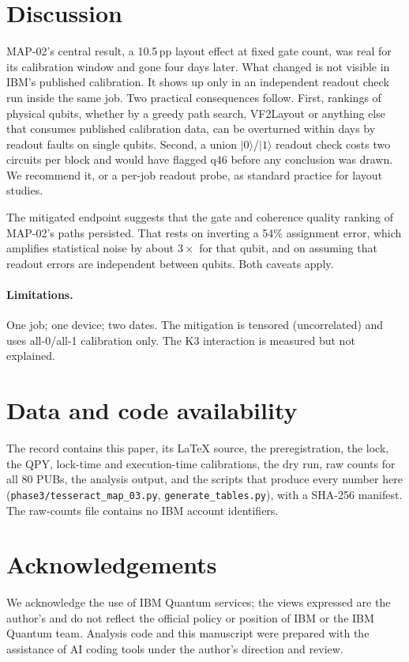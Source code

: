 \documentclass[10pt,twocolumn]{article}
\begin{document}
\section{Discussion}
MAP-02's central result, a 10.5\,pp layout effect at fixed gate count, was real for its calibration
window and gone four days later. What changed is not visible in IBM's published calibration. It
shows up only in an independent readout check run inside the same job. Two practical consequences
follow. First, rankings of physical qubits, whether by a greedy path search, VF2Layout or anything
else that consumes published calibration data, can be overturned within days by readout faults on
single qubits. Second, a union $|0\rangle$/$|1\rangle$ readout check costs two circuits per block and
would have flagged q46 before any conclusion was drawn. We recommend it, or a per-job readout probe,
as standard practice for layout studies.

The mitigated endpoint suggests that the gate and coherence quality ranking of MAP-02's paths
persisted. That rests on inverting a 54\% assignment error, which amplifies statistical noise by about
$3\times$ for that qubit, and on assuming that readout errors are independent between qubits. Both
caveats apply.

\paragraph{Limitations.} One job; one device; two dates. The mitigation is tensored (uncorrelated) and
uses all-0/all-1 calibration only. The K3 interaction is measured but not explained.

\section*{Data and code availability}
The record contains this paper, its LaTeX source, the preregistration, the lock, the QPY, lock-time and
execution-time calibrations, the dry run, raw counts for all 80 PUBs, the analysis output, and the
scripts that produce every number here (\texttt{phase3/tesseract\_map\_03.py},
\texttt{generate\_tables.py}), with a SHA-256 manifest. The raw-counts file contains no IBM account
identifiers.

\section*{Acknowledgements}
We acknowledge the use of IBM Quantum services; the views expressed are the author's and do not reflect
the official policy or position of IBM or the IBM Quantum team. Analysis code and this manuscript were
prepared with the assistance of AI coding tools under the author's direction and review.
\end{document}

